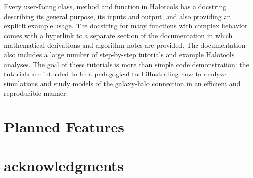 \documentclass[usenatbib,usegraphicx,letterpaper]{mn2e}
\begin{document}
Every user-facing class, method and function in Halotools has a docstring describing its general purpose, its inputs and output, and also providing an explicit example usage. The docstring for many functions with complex behavior comes with a hyperlink to a separate section of the documentation in which mathematical derivations and algorithm notes are provided. The documentation also includes a large number of step-by-step tutorials and example Halotools analyses. The goal of these tutorials is more than simple code demonstration: the tutorials are intended to be a pedagogical tool illustrating how to analyze simulations and study models of the galaxy-halo connection in an efficient and reproducible manner. 


\section{Planned Features}
\label{section:planned_features}


\section{acknowledgments}












\end{document}
